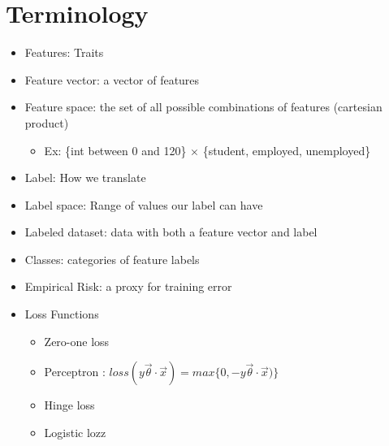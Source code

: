 \documentclass[10pt, oneside]{article}
\begin{document}
\section{Terminology}
\begin{itemize}
    \item Features: Traits
    \item Feature vector: a vector of features
    \item Feature space: the set of all possible combinations of features (cartesian product)
    \begin{itemize}
        \item Ex: \{int between 0 and 120\} $\times$ \{student, employed, unemployed\}
    \end{itemize}
    \item Label: How we translate
    \item Label space: Range of values our label can have
    \item Labeled dataset: data with both a feature vector and label
    \item Classes: categories of feature labels
    \item Empirical Risk: a proxy for training error
    \item Loss Functions
    \begin{itemize}
        \item Zero-one loss
        \item Perceptron : $loss(y\vec\theta \cdot \vec x) =max \{0, -y \vec \theta \cdot \vec x)\}$
        \item Hinge loss
        \item Logistic lozz
    \end{itemize}
\end{itemize}
\end{document}
